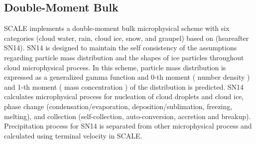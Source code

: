 \subsection{Double-Moment Bulk \cite{sn_2014}}

SCALE implements a double-moment bulk microphysical scheme with six categories (cloud water, rain, cloud ice, snow, and graupel) 
based on \cite{sn_2014} (heareafter SN14).
SN14 is designed to maintain the self consistency of the assumptions regarding particle mass distribution and
the shapes of ice particles throughout cloud microphysical process.
In this scheme, particle mass distribution is expressed as a generalized gamma function and 0-th moment ( number density ) and
1-th moment ( mass concentration ) of the distribution is predicted. 
SN14 calculates microphysical process for nucleation of cloud droplets and cloud ice,
phase change (condensation/evaporation, deposition/sublimation, freezing, melting), and
collection (self-collection, auto-conversion, accretion and breakup).
Precipitation process for SN14 is separated from other microphysical process and calculated using terminal velocity in SCALE.
